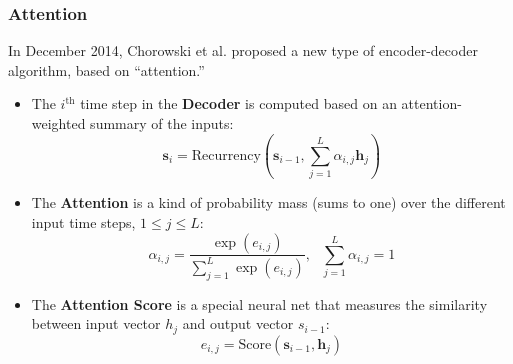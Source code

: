 \documentclass{beamer}
\begin{document}
\begin{frame}
  \frametitle{Attention}

  In December 2014, Chorowski et al. proposed a new type of
  encoder-decoder algorithm, based on ``attention.''
  \begin{itemize}
  \item The $i^{\textrm{th}}$ time step in the {\bf Decoder} is
    computed based on an attention-weighted summary of the inputs:
    \begin{displaymath}
      \bm{s}_i = \mbox{Recurrency}\left(\bm{s}_{i-1},\sum_{j=1}^L\alpha_{i,j}\bm{h}_j\right)
    \end{displaymath}
  \item The {\bf Attention} is a kind of probability mass (sums to one) over
    the different input time steps, $1\le j\le L$:
    \begin{displaymath}
      \alpha_{i,j} = \frac{\exp(e_{i,j})}{\sum_{j=1}^L \exp(e_{i,j})},~~~\sum_{j=1}^L \alpha_{i,j}=1
    \end{displaymath}
  \item The {\bf Attention Score} is a special neural net that
    measures the similarity between input vector $h_j$ and output
    vector $s_{i-1}$:
    \begin{displaymath}
      e_{i,j} = \mbox{Score}(\bm{s}_{i-1},\bm{h}_j)
    \end{displaymath}
  \end{itemize}
\end{frame}
\end{document}
